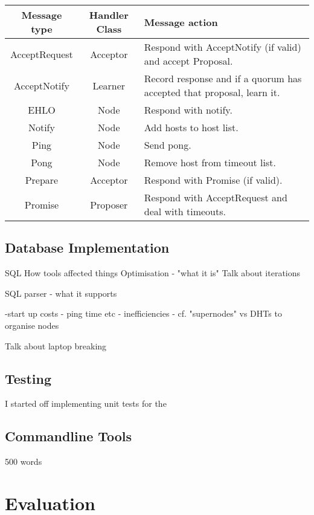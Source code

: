\documentclass[12pt,twoside,notitlepage]{report}
\begin{document}
\begin{tabular}{ | c | c | p{7cm} | }
  \hline
  {\bf Message type} & {\bf Handler Class} & {\bf Message action} \\ \hline
  AcceptRequest & Acceptor & Respond with AcceptNotify (if valid) and accept Proposal. \\ \hline
  AcceptNotify & Learner & Record response and if a quorum has accepted that proposal, learn it. \\ \hline
  EHLO & Node & Respond with notify. \\ \hline
  Notify & Node & Add hosts to host list. \\ \hline
  Ping & Node & Send pong.  \\ \hline
  Pong & Node & Remove host from timeout list. \\ \hline
  Prepare & Acceptor & Respond with Promise (if valid). \\ \hline
  Promise & Proposer & Respond with AcceptRequest and deal with timeouts. \\ \hline
\end{tabular}



\section{Database Implementation}

SQL
How tools affected things
Optimisation - "what it is"
Talk about iterations

SQL parser
- what it supports

-start up costs
  - ping time etc
  - inefficiencies
  - cf. "supernodes" vs DHTs to organise nodes

Talk about laptop breaking

\section{Testing}

I started off implementing unit tests for the 

\section{Commandline Tools}

500 words


\cleardoublepage
\chapter{Evaluation}
\end{document}
